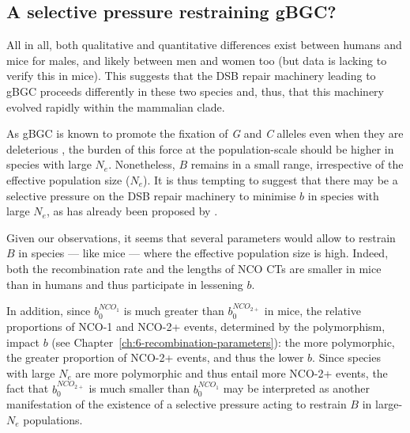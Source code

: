 



\subsection{A selective pressure restraining gBGC?}

All in all, both qualitative and quantitative differences exist between humans and mice for males, and likely between men and women too (but data is lacking to verify this in mice).
This suggests that the DSB repair machinery leading to gBGC proceeds differently in these two species and, thus, that this machinery evolved rapidly within the mammalian clade.

As gBGC is known to promote the fixation of \textit{G} and \textit{C} alleles even when they are deleterious \citep{galtier2009gcbiased, necsulea2011meiotic}, the burden of this force at the population-scale should be higher in species with large $N_e$. Nonetheless, $B$ remains in a small range, irrespective of the effective population size ($N_e$). It is thus tempting to suggest that there may be a selective pressure on the DSB repair machinery to minimise $b$ in species with large $N_e$, as has already been proposed by \citet{galtier2018codon}.

Given our observations, it seems that several parameters would allow to restrain $B$ in species — like mice — where the effective population size is high.
Indeed, both the recombination rate and the lengths of NCO CTs are smaller in mice than in humans and thus participate in lessening $b$.

In addition, since $b_0^{NCO_1}$ is much greater than $b_0^{NCO_{2+}}$ in mice, the relative proportions of NCO-1 and NCO-2+ events, determined by the polymorphism, impact $b$ (see Chapter~\ref{ch:6-recombination-parameters}): the more polymorphic, the greater proportion of NCO-2+ events, and thus the lower $b$. Since species with large $N_e$ are more polymorphic and thus entail more NCO-2+ events, the fact that $b_0^{NCO_{2+}}$ is much smaller than $b_0^{NCO_1}$ may be interpreted as another manifestation of the existence of a selective pressure acting to restrain $B$ in large-$N_e$ populations.




